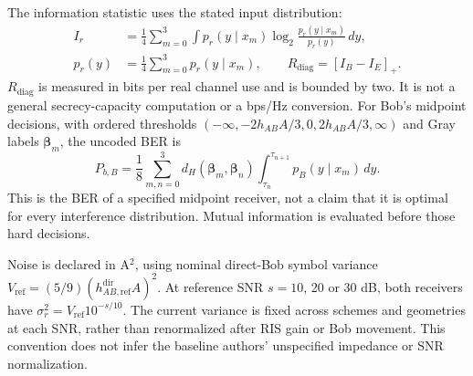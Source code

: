 \documentclass[journal,10pt,twocolumn]{IEEEtran}
\begin{document}
The information statistic uses the stated input distribution:
\begin{equation}
\begin{aligned}
I_r&=\frac14\sum_{m=0}^{3}\int p_r(y\mid x_m)
\log_2\frac{p_r(y\mid x_m)}{p_r(y)}\,dy,\\
p_r(y)&=\frac14\sum_{m=0}^{3}p_r(y\mid x_m),\qquad
R_{\mathrm{diag}}=[I_B-I_E]_+ .
\end{aligned}
\label{eq:diagnosticinformation}
\end{equation}
$R_{\mathrm{diag}}$ is measured in bits per real channel use and is bounded by two. It is not a general secrecy-capacity computation or a bps/Hz conversion. For Bob's midpoint decisions, with ordered thresholds $(-\infty,-2h_{AB}A/3,0,2h_{AB}A/3,\infty)$ and Gray labels $\boldsymbol{\beta}_m$, the uncoded BER is
\begin{equation}
P_{b,B}=\frac18\sum_{m,n=0}^{3}
d_H(\boldsymbol{\beta}_m,\boldsymbol{\beta}_n)
\int_{\tau_n}^{\tau_{n+1}}p_B(y\mid x_m)\,dy.
\label{eq:diagnosticber}
\end{equation}
This is the BER of a specified midpoint receiver, not a claim that it is optimal for every interference distribution. Mutual information is evaluated before those hard decisions.

Noise is declared in A$^2$, using nominal direct-Bob symbol variance $V_{\mathrm{ref}}=(5/9)(h_{AB,\mathrm{ref}}^{\mathrm{dir}}A)^2$. At reference SNR $s=10$, 20 or 30 dB, both receivers have $\sigma_r^2=V_{\mathrm{ref}}10^{-s/10}$. The current variance is fixed across schemes and geometries at each SNR, rather than renormalized after RIS gain or Bob movement. This convention does not infer the baseline authors' unspecified impedance or SNR normalization.
\end{document}
